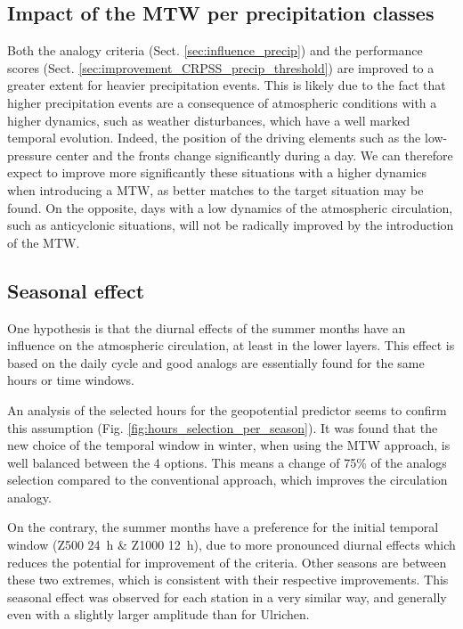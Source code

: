 \documentclass[hess, manuscript]{copernicus}
\begin{document}
\subsection{Impact of the MTW per precipitation classes}

Both the analogy criteria (Sect. \ref{sec:influence_precip}) and the performance scores (Sect. \ref{sec:improvement_CRPSS_precip_threshold}) are improved to a greater extent for heavier precipitation events. This is likely due to the fact that higher precipitation events are a consequence of atmospheric conditions with a higher dynamics, such as weather disturbances, which have a well marked temporal evolution. Indeed, the position of the driving elements such as the low-pressure center and the fronts change significantly during a day. We can therefore expect to improve more significantly these situations with a higher dynamics when introducing a MTW, as better matches to the target situation may be found. On the opposite, days with a low dynamics of the atmospheric circulation, such as anticyclonic situations, will not be radically improved by the introduction of the MTW.


\subsection{Seasonal effect}


One hypothesis is that the diurnal effects of the summer months have an influence on the atmospheric circulation, at least in the lower layers. This effect is based on the daily cycle and good analogs are essentially found for the same hours or time windows.

An analysis of the selected hours for the geopotential predictor seems to confirm this assumption (Fig. \ref{fig:hours_selection_per_season}). It was found that the new choice of the temporal window in winter, when using the MTW approach, is well balanced between the 4 options. This means a change of 75\% of the analogs selection compared to the conventional approach, which improves the circulation analogy.

On the contrary, the summer months have a preference for the initial temporal window (Z500 24~h \& Z1000 12~h), due to more pronounced diurnal effects which reduces the potential for improvement of the criteria. Other seasons are between these two extremes, which is consistent with their respective improvements. This seasonal effect was observed for each station in a very similar way, and generally even with a slightly larger amplitude than for Ulrichen.
\end{document}
